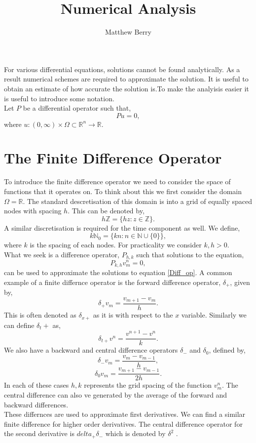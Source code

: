 \documentclass[12pt]{article}
\title{Numerical Analysis}
\author{Matthew Berry}
\newcommand{\R}{\mathbb{R}}
\newcommand{\Z}{\mathbb{Z}}
\newcommand{\N}{\mathbb{N}}
\theoremstyle{definition}
\begin{document}
\maketitle

For various differential equations, solutions cannot be found analytically. As a result numerical schemes are required to approximate the solution. It is useful to obtain an estimate of how accurate the solution is.To make the analyisis easier it is useful to introduce some notation.\\
Let $P$ be a differential operator such that,
\begin{equation}
Pu=0,\label{Diff_op}
\end{equation} 
where $u:(0,\infty)\times\Omega\subset\R^n\rightarrow \R$.\\
\section{The Finite Difference Operator}
\label{fin_diff}
To introduce the finite difference operator we need to consider the space of functions that it operates on. To think about this we first consider the domain $\Omega=\R$. The standard descretisation of this domain is into a grid of equally spaced nodes with spacing $h$. This can be denoted by,
\begin{equation*}
h\Z=\{hz:z\in \Z\}.
\end{equation*}
A similar discretisation is required for the time component as well. We define,
\begin{equation*}
k\N_0=\{kn:n\in \N\cup\{0\}\},
\end{equation*}
where $k$ is the spacing of each nodes.
For practicality we consider $k,h>0$.\\
What we seek is a difference operator, $P_{h,k}$ such that solutions to the equation,
\begin{equation}
P_{k,h}v_m^n=0, \label{fin_op}
\end{equation} 
can be used to approximate the solutions to equation \ref{Diff_op}. A common example of a finite differnce operator is the forward difference operator, $\delta_+$, given by, $$\delta_+ v_m=\frac{v_{m+1}-v_m}{h}.$$
This is often denoted as $\delta_{x+}$ as it is with respect to the $x$ variable. Similarly we can define $\delta_t+$ as, 
$$\delta_{t+}v^n=\frac{v^{n+1}-v^n}{k}.$$
We also have a backward and central difference operators $\delta_-$ and $\delta_0$, defined by,
$$\delta_-v_m=\frac{v_m-v_{m-1}}{h},$$
$$\delta_0 v_m=\frac{v_{m+1}-v_{m-1}}{2h}.$$
In each of these cases $h,k$ represents the grid spacing of the function $v_m^n$. The central difference can also ve generated by the average of the forward and backward differences.\\
These differnces are used to approximate first derivatives. We can find a similar finite difference for higher order derivatives. The central difference operator for the second derivative is $delta_+\delta_-$ which is denoted by $\delta^2$ .
\end{document}
